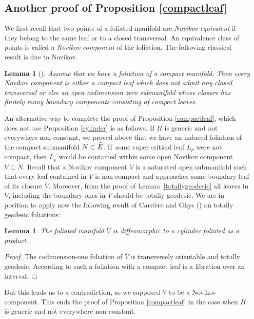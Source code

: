 \documentclass[10pt]{amsart}
\newtheorem{lemma}[theorem]{Lemma}
\theoremstyle{definition}
\theoremstyle{remark}
\numberwithin{equation}{section}
\begin{document}
\subsection{Another proof of Proposition \ref{compactleaf}}
We first recall that two points of a foliated manifold are \emph{Novikov equivalent} if
they belong to the same leaf or to a closed transversal.
An equivalence class of points is called a \emph{Novikov component} of the foliation.
The following classical result is due to Novikov.
\begin{lemma}[\cite{Nov}]\label{novikov}
Assume that we have a foliation of a compact manifold.
Then every Novikov component is either a compact leaf which does not admit
any closed transversal or else an open codimension zero
submanifold whose closure has finitely many boundary components
consisting of compact leaves.
\end{lemma}
An alternative way to complete the proof of Proposition \ref{compactleaf},
which does not use Proposition \ref{cylinder}
is as follows. If $H$ is generic and
not everywhere non-constant, we proved above that we have an induced
foliation of the compact submanifold $N\subset\nobreak \widehat{E}$.
If~some super critical leaf $L_p$ were not compact,
then $L_p$ would be contained within some open Novikov component
$V\subset N$. Recall that a Novikov component $V$ is a saturated open submanifold
such that every leaf contained in $V$ is non-compact and \hbox{approaches} some boundary leaf of
its closure $\overline{V}$. Moreover, from the proof of Lemma~\ref{totallygeodesic}
all leaves in $V$, including the boundary ones in $\overline{V}$ should be totally geodesic.
We are in position to apply now the following result of Carrière and Ghys (\cite{Car-Ghys}) on
totally geodesic foliations:

\begin{lemma}\label{cylinder2}
The foliated manifold $\overline{V}$ is diffeomorphic to a
cylinder foliated as a product.
\end{lemma}
\begin{proof}
The codimension-one foliation of $\overline{V}$ is transversely orientable and
totally geodesic. According to \cite[Prop.\,II.2]{Car-Ghys} such a foliation with a
compact leaf is a fibration over an interval.
\end{proof}

But this leads us to a contradiction, as we supposed $V$ to be a Novikov component.
This ends the proof of Proposition \ref{compactleaf} in the case when $H$ is generic and
not everywhere non-constant.
\end{document}

